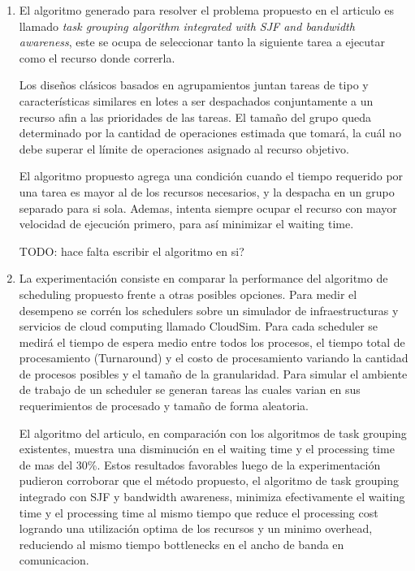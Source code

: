 \begin{enumerate}[label=\alph*)]

    \item El algoritmo generado para resolver el problema propuesto en el articulo es llamado \emph{task grouping
algorithm integrated with SJF and bandwidth awareness}, este se ocupa de seleccionar tanto
        la siguiente tarea a ejecutar como el recurso donde correrla.

        Los diseños clásicos basados en agrupamientos juntan tareas de tipo
        y características similares en lotes a ser despachados conjuntamente
        a un recurso afin a las prioridades de las tareas.
        El tamaño del grupo queda determinado por la cantidad de operaciones
        estimada que tomará, la cuál no debe superar el límite de operaciones
        asignado al recurso objetivo.

        El algoritmo propuesto agrega una condición cuando el tiempo requerido
        por una tarea es mayor al de los recursos necesarios, y la despacha
        en un grupo separado para si sola. Ademas, intenta siempre ocupar
        el recurso con mayor velocidad de ejecución primero, para así minimizar
        el waiting time.

        TODO: hace falta escribir el algoritmo en si?

    \item La experimentación consiste en comparar la performance del algoritmo de scheduling propuesto frente a otras posibles opciones. Para medir el desempeno se corrén los schedulers sobre un simulador de infraestructuras y servicios de cloud computing llamado CloudSim. Para cada scheduler se medirá el tiempo de espera medio entre todos los procesos, el tiempo total de procesamiento (Turnaround) y el costo de procesamiento variando la cantidad de procesos posibles y el tamaño de la granularidad. Para simular el ambiente de trabajo de un scheduler se generan tareas las cuales varian en sus requerimientos de procesado y tamaño de forma aleatoria.

El algoritmo del articulo, en comparación con los algoritmos de task grouping existentes, muestra una disminución en el waiting time y el processing time de mas del 30\%. Estos resultados favorables luego de la experimentación pudieron corroborar que el método propuesto, el algoritmo de task grouping integrado con SJF y bandwidth awareness, minimiza efectivamente el waiting time y el processing time al mismo tiempo que reduce el processing cost logrando una utilización optima de los recursos y un minimo overhead, reduciendo al mismo tiempo bottlenecks en el ancho de banda en comunicacion.

\end{enumerate}

